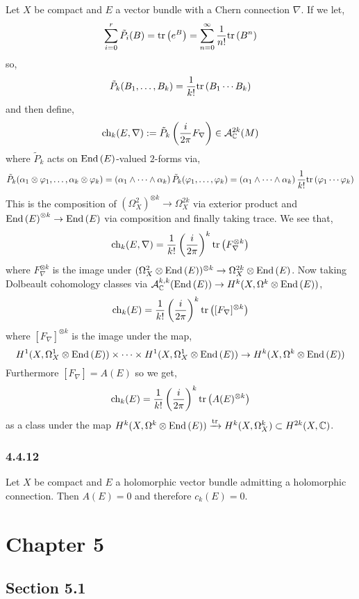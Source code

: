 \documentclass[12pt]{article}
\begin{document}
Let $X$ be compact \kahler and $E$ a vector bundle with a Chern connection $\nabla$. If we let,
\[ \sum_{i = 0}^r \tilde{P}_i(B) = \mathrm{tr}\left( e^B \right) = \sum_{n = 0}^\infty \frac{1}{n!} \mathrm{tr}\left( B^n \right)  \]
so,
\[ \tilde{P}_k(B_1, \dots, B_k) = \frac{1}{k!} \mathrm{tr}\left( B_1 \cdots B_k \right) \] 
and then define,
\[ \mathrm{ch}_k(E,\nabla) := \tilde{P}_k \left( \frac{i}{2 \pi} F_\nabla \right) \in \mathcal{A}_{\mathbb{C}}^{2k}(M) \]
where $\tilde{P}_k$ acts on $\mathrm{End} \left( E \right)$-valued $2$-forms via,
\[ \tilde{P}_k(\alpha_1 \otimes \varphi_1, \dots, \alpha_k \otimes \varphi_k) = (\alpha_1 \wedge \cdots \wedge \alpha_k) \, \tilde{P}_k(\varphi_1, \dots, \varphi
_k) = (\alpha_1 \wedge \cdots \wedge \alpha_k) \, \frac{1}{k!} \mathrm{tr}\left( \varphi_1 \cdots \varphi_k \right) \]
This is the composition of $(\Omega_X^2)^{\otimes k} \to \Omega_X^{2k}$ via exterior product and $\mathrm{End} \left( E \right)^{\otimes k} \to \mathrm{End} \left( E \right)$ via composition and finally taking trace. We see that,
\[ \mathrm{ch}_k(E, \nabla) = \frac{1}{k!} \left( \frac{i}{2 \pi} \right)^k \mathrm{tr}\left( F_\nabla^{\otimes k} \right) \]
where $F_\nabla^{\otimes k}$ is the image under $(\Omega_X^2 \otimes \mathrm{End} \left( E \right))^{\otimes k} \to \Omega_X^{2k} \otimes \mathrm{End} \left( E \right)$. Now taking Dolbeault  cohomology classes via $\mathcal{A}^{k,k}_{\mathbb{C}}(\mathrm{End} \left( E \right)) \to H^k(X, \Omega^k \otimes \mathrm{End} \left( E \right))$,
\[ \mathrm{ch}_k(E) = \frac{1}{k!} \left( \frac{i}{2 \pi} \right)^k \mathrm{tr}\left( [F_\nabla]^{\otimes k} \right) \]
where $[F_\nabla]^{\otimes k}$ is the image under the map,
\[ H^1(X, \Omega^1_X \otimes \mathrm{End} \left( E \right)) \times \cdots \times H^1(X, \Omega^1_X \otimes \mathrm{End} \left( E \right)) \to H^{k}(X, \Omega^k \otimes \mathrm{End} \left( E \right)) \]
Furthermore $[F_\nabla] = A(E)$ so we get,
\[ \mathrm{ch}_k(E) = \frac{1}{k!} \left( \frac{i}{2 \pi} \right)^k \mathrm{tr}\left( A(E)^{\otimes k} \right) \]
as a class under the map $H^k(X, \Omega^k \otimes \mathrm{End} \left( E \right)) \xrightarrow{\mathrm{tr}} H^k(X, \Omega^k_X) \subset H^{2k}(X, \mathbb{C})$.

\subsubsection{4.4.12}

Let $X$ be compact \kahler and $E$ a holomorphic vector bundle admitting a holomorphic connection. Then $A(E) = 0$ and therefore $c_k(E) = 0$. 

\section{Chapter 5}

\subsection{Section 5.1}
\end{document}
